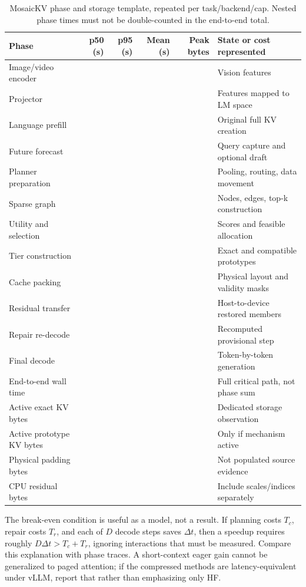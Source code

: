 \begin{table}[t]
\caption{MosaicKV phase and storage template, repeated per task/backend/cap.
Nested phase times must not be double-counted in the end-to-end total.}
\small\begin{tabularx}{\textwidth}{YrrrrY}\toprule
Phase & p50 (s) & p95 (s) & Mean (s) & Peak bytes & State or cost represented\\\midrule
Image/video encoder & & & & & Vision features\\
Projector & & & & & Features mapped to LM space\\
Language prefill & & & & & Original full KV creation\\
Future forecast & & & & & Query capture and optional draft\\
Planner preparation & & & & & Pooling, routing, data movement\\
Sparse graph & & & & & Nodes, edges, top-k construction\\
Utility and selection & & & & & Scores and feasible allocation\\
Tier construction & & & & & Exact and compatible prototypes\\
Cache packing & & & & & Physical layout and validity masks\\
Residual transfer & & & & & Host-to-device restored members\\
Repair re-decode & & & & & Recomputed provisional step\\
Final decode & & & & & Token-by-token generation\\
End-to-end wall time & & & & & Full critical path, not phase sum\\\midrule
Active exact KV bytes & & & & & Dedicated storage observation\\
Active prototype KV bytes & & & & & Only if mechanism active\\
Physical padding bytes & & & & & Not populated source evidence\\
CPU residual bytes & & & & & Include scales/indices separately\\
\bottomrule\end{tabularx}
\end{table}

The break-even condition is useful as a model, not a result. If planning costs
$T_c$, repair costs $T_r$, and each of $D$ decode steps saves $\Delta t$, then
a speedup requires roughly $D\Delta t>T_c+T_r$, ignoring interactions that must
be measured. Compare this explanation with phase traces. A short-context eager
gain cannot be generalized to paged attention; if the compressed methods are
latency-equivalent under vLLM, report that rather than emphasizing only HF.

